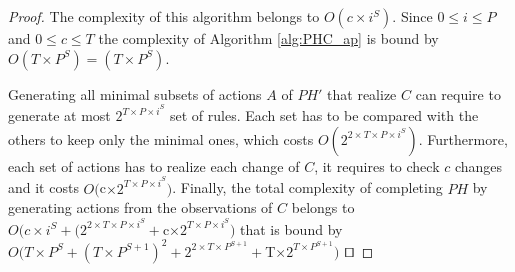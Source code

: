 \begin{theorem}[Complexity]
\begin{proof}
		The complexity of this algorithm belongs to $O(c\times i^S)$.
		Since $0 \leq i \leq P$ and $0 \leq c \leq T$ the complexity of Algorithm \ref{alg:PHC_ap} is bound by $O(T\times P^S) = (T\times P^S)$.
		
		Generating all minimal subsets of actions $A$ of $PH'$ that realize $C$ can require to generate at most $2^{T\times  P \times  i^S}$ set of rules.
		Each set has to be compared with the others to keep only the minimal ones, which costs $O(2^{2\times T\times  P \times  i^S})$.
		Furthermore, each set of actions has to realize each change of $C$, it requires to check $c$ changes and it costs $O($c$ \times  2^{T\times  P \times  i^S})$.
		Finally, the total complexity of completing $PH$ by generating actions from the observations of $C$ belongs to
		$O(c\times i^S + (2^{2\times T\times  P \times  i^S} + $c$ \times  2^{T\times  P \times  i^S})$ that is bound by $O(T\times P^S + (T\times P^{S+1})^2 + 2^{2\times T\times P^{S+1}} + $T$ \times  2^{T\times  P^{S+1}})$
		$\qed$
	\end{proof}
\end{theorem}




